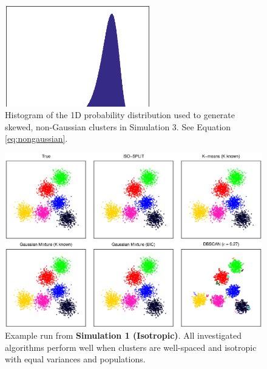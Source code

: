 \documentclass[10pt]{article}
\begin{document}
\begin{figure}
\begin{center}
\includegraphics[width=2.5in]{images/nongaussian_histogram.eps}
\end{center}
\caption{
Histogram of the 1D probability distribution used to generate skewed, non-Gaussian clusters in Simulation 3. See Equation \eqref{eq:nongaussian}.
}
\label{fig:nongaussian_histogram}
\end{figure}

\begin{figure}
\begin{center}
\includegraphics[width=5.5in]{images/simulation1.eps}
\end{center}
\caption{
Example run from \textbf{Simulation 1 (Isotropic)}. All investigated algorithms perform well when clusters are well-spaced and isotropic with equal variances and populations.
}
\label{fig:simulation1}
\end{figure}
\end{document}
